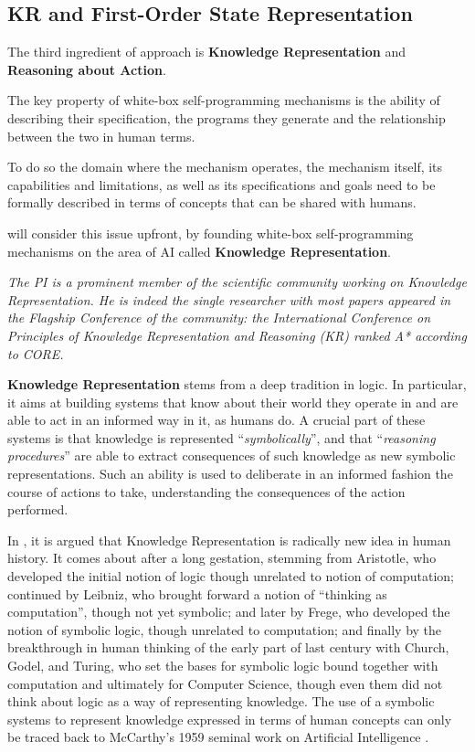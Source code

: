 \subsection{KR and First-Order State Representation}

The third ingredient of \project approach is \textbf{Knowledge Representation} and \textbf{Reasoning about Action}.


The key property of white-box self-programming mechanisms is the
ability of describing their specification, the programs they generate
and the relationship between the two in human terms.

To do so the domain where the mechanism operates, the 
mechanism itself, its capabilities and limitations, as well as
its specifications and goals need to be formally described in terms of concepts that
can be shared with humans.

\project will consider this issue upfront, by founding white-box self-programming mechanisms on the area of AI called \textbf{Knowledge Representation}. 

\emph{
The PI is  a prominent member of the scientific community working on Knowledge Representation. He is indeed the single researcher with most papers appeared in the Flagship Conference of the community: the International Conference on Principles of Knowledge Representation and Reasoning (KR) ranked A* according to CORE.
}


\textbf{Knowledge Representation} stems from a deep
tradition in logic. In particular, it aims at building systems that
know about their world they operate in and are able to act in an informed way in it,
as humans do.
A crucial part of these systems is that knowledge is represented
``\emph{symbolically}'', and that ``\emph{reasoning procedures}'' are able to extract
consequences of such knowledge as new symbolic representations. Such
an ability is used to deliberate in an informed fashion the course of
actions to take, understanding the consequences of the action performed.

In \cite{Levesque14,Levesque17}, it is argued that Knowledge Representation is
radically new idea in human history. It comes about after a long
gestation, stemming from Aristotle, who developed the initial notion
of logic though unrelated to notion of computation; continued by
Leibniz, who brought forward a notion of ``thinking as computation'',
though not yet symbolic; and later by Frege, who developed the notion
of symbolic logic, though unrelated to computation; and finally by the
breakthrough in human thinking of the early part of last century with
Church, Godel, and Turing, who set the bases for symbolic logic bound
together with computation and ultimately for Computer Science, though
even them did not think about logic as a way of representing
knowledge. The use of a symbolic systems to represent knowledge
expressed in terms of human concepts can only be traced back to
McCarthy's 1959 seminal work on Artificial Intelligence \cite{McCa57}.

